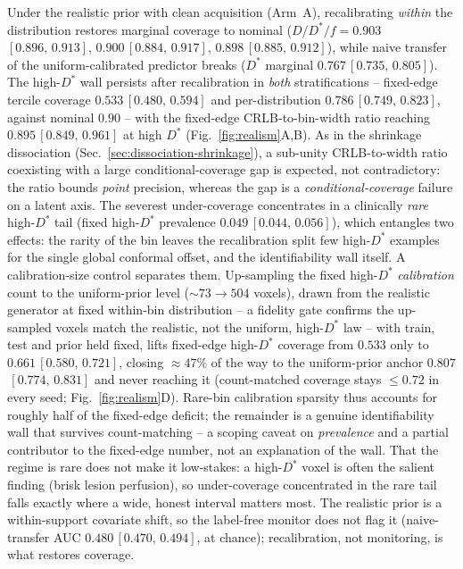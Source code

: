 \documentclass[11pt]{article}
\newcommand{\Dstar}{D^{*}}
\newcommand{\band}[2]{{\scriptsize\,$[#1,\,#2]$}}
\begin{document}
Under the realistic prior with clean acquisition (Arm~A), recalibrating
\emph{within} the distribution restores marginal coverage to nominal ($D/\Dstar/f =
0.903$\band{0.896}{0.913}, $0.900$\band{0.884}{0.917}, $0.898$\band{0.885}{0.912}),
while naive transfer of the uniform-calibrated predictor breaks ($\Dstar$ marginal
$0.767$\band{0.735}{0.805}). The high-$\Dstar$ wall persists after recalibration in
\emph{both} stratifications -- fixed-edge tercile coverage $0.533$\band{0.480}{0.594}
and per-distribution $0.786$\band{0.749}{0.823}, against nominal $0.90$ -- with the
fixed-edge CRLB-to-bin-width ratio reaching $0.895$\band{0.849}{0.961} at high
$\Dstar$ (Fig.~\ref{fig:realism}A,B). As in the shrinkage dissociation
(Sec.~\ref{sec:dissociation-shrinkage}), a sub-unity CRLB-to-width ratio coexisting
with a large conditional-coverage gap is expected, not contradictory: the ratio
bounds \emph{point} precision, whereas the gap is a \emph{conditional-coverage}
failure on a latent axis. The severest under-coverage concentrates in a clinically
\emph{rare} high-$\Dstar$ tail (fixed high-$\Dstar$ prevalence
$0.049$\band{0.044}{0.056}), which entangles two effects: the rarity of the bin
leaves the recalibration split few high-$\Dstar$ examples for the single global
conformal offset, and the identifiability wall itself. A calibration-size control
separates them. Up-sampling the fixed high-$\Dstar$ \emph{calibration} count to the
uniform-prior level ($\sim\!73\to504$ voxels), drawn from the realistic generator at
fixed within-bin distribution -- a fidelity gate confirms the up-sampled voxels match
the realistic, not the uniform, high-$\Dstar$ law -- with train, test and prior held
fixed, lifts fixed-edge high-$\Dstar$ coverage from $0.533$ only to
$0.661$\band{0.580}{0.721}, closing $\approx\!47\%$ of the way to the uniform-prior
anchor $0.807$\band{0.774}{0.831} and never reaching it (count-matched coverage stays
$\le0.72$ in every seed; Fig.~\ref{fig:realism}D). Rare-bin calibration sparsity thus
accounts for roughly half of the fixed-edge deficit; the remainder is a genuine
identifiability wall that survives count-matching -- a scoping caveat on
\emph{prevalence} and a partial contributor to the fixed-edge number, not an
explanation of the wall. That the regime is rare does not make it low-stakes: a
high-$\Dstar$ voxel is often the salient finding (brisk lesion perfusion), so
under-coverage concentrated in the rare tail falls exactly where a wide, honest
interval matters most.
The realistic prior is a within-support covariate shift, so the label-free monitor
does not flag it (naive-transfer AUC $0.480$\band{0.470}{0.494}, at chance);
recalibration, not monitoring, is what restores coverage.
\end{document}
